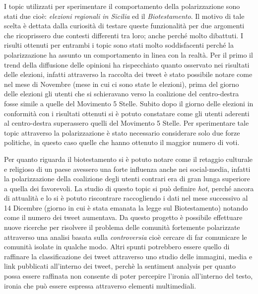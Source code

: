 \documentclass[a4paper,12pt]{article}
\begin{document}
I topic utilizzati per sperimentare il comportamento della polarizzazione sono stati due cioè: \textit{elezioni regionali in Sicilia} ed il \textit{Biotestamento}. Il motivo di tale scelta è dettata dalla curiosità di testare queste funzionalità per due argomenti che ricoprissero due contesti differenti tra loro; anche perché molto dibattuti. I risulti ottenuti per entrambi i topic sono stati molto soddisfacenti perché la polarizzazione ha assunto un comportamento in linea con la realtà. 
Per il primo il trend della diffusione delle opinioni ha rispecchiato quanto osservato nei risultati delle elezioni, infatti attraverso la raccolta dei tweet è stato possibile notare come nel mese di Novembre (mese in cui ci sono state le elezioni), prima del giorno delle elezioni gli utenti che si schieravano verso la coalizione del centro-destra fosse simile a quelle del Movimento 5 Stelle. Subito dopo il giorno delle elezioni in conformità con i risultati ottenuti si è potuto constatare come gli utenti aderenti al centro-destra superassero quelli del Movimento 5 Stelle. Per sperimentare tale topic attraverso la polarizzazione è stato necessario considerare solo due forze politiche, in questo caso quelle che hanno ottenuto il maggior numero di voti.

Per quanto riguarda il  biotestamento si è potuto notare come il retaggio culturale e religioso di un paese avessero una forte influenza anche nei social-media, infatti la polarizzazione della coalizione degli utenti contrari era di gran lunga superiore a quella dei favorevoli. 
La studio di questo topic si può definire \textit{hot}, perché ancora di attualità e lo si è potuto riscontrare raccogliendo i dati nel mese successivo al 14 Dicembre (giorno in cui è stata emanata la legge sul Biotestamento) notando come il numero dei tweet aumentava.
Da questo progetto è possibile effettuare nuove ricerche per risolvere il problema delle comunità fortemente polarizzate attraverso una analisi basata sulla \textit{controversia} cioè cercare di far comunicare le comunità isolate in qualche modo. Altri spunti potrebbero essere quello di raffinare la classificazione dei tweet attraverso uno studio delle immagini, media e link pubblicati all'interno dei tweet, perchè la sentiment analysis per quanto possa essere raffinata non consente di poter percepire l'ironia all'interno del testo, ironia che può essere espressa attraverso elementi multimediali.
\end{document}
